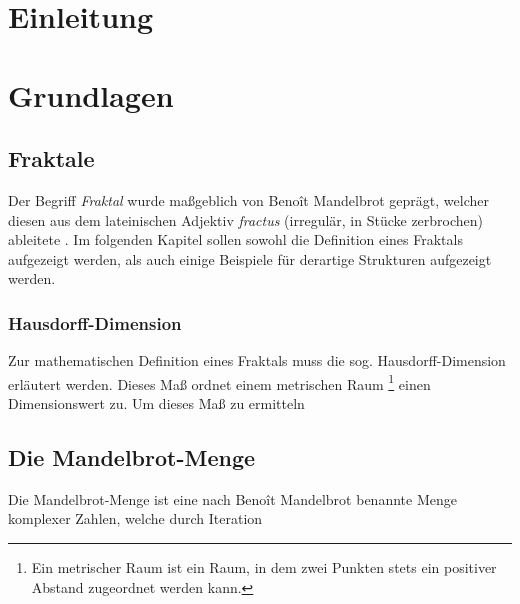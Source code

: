 \documentclass[a4paper,12pt,onesided]{report}
\begin{document}
\newpage
\chapter{Einleitung}

\chapter{Grundlagen}
\section{Fraktale}
Der Begriff \textit{Fraktal} wurde maßgeblich von Benoît Mandelbrot geprägt, welcher diesen aus dem lateinischen Adjektiv
\textit{fractus} (irregulär, in Stücke zerbrochen) ableitete \cite{mandelbrot2013fraktale}. Im folgenden Kapitel sollen sowohl
die Definition eines Fraktals aufgezeigt werden, als auch einige Beispiele für derartige Strukturen aufgezeigt werden.
\subsection{Hausdorff-Dimension}
Zur mathematischen Definition eines Fraktals muss die sog. Hausdorff-Dimension erläutert werden. 
Dieses Maß ordnet einem metrischen Raum \footnote{Ein metrischer Raum ist ein Raum, in dem zwei Punkten
stets ein positiver Abstand zugeordnet werden kann.} einen Dimensionswert zu.
Um dieses Maß zu ermitteln %


\section{Die Mandelbrot-Menge}
Die Mandelbrot-Menge ist eine nach Benoît Mandelbrot benannte Menge komplexer Zahlen,
welche durch Iteration 

{}

\end{document}

